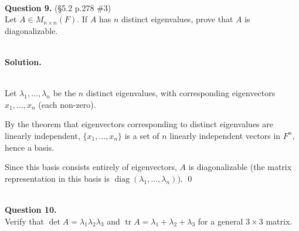 \documentclass{article}
\DeclareMathOperator{\tr}{tr}
\begin{document}
\bigskip

\hfill \break  $~\!\!$ \dotfill \medskip \\
\textbf{Question 9.} (\S5.2 p.278 \#3)\\
Let $A \in M_{n\times n}(F)$. If $A$ has $n$ distinct eigenvalues, prove that $A$ is diagonalizable.

\noindent\\
\textbf{Solution.}\\
\quad\\
\begin{mdframed}[linewidth=1pt]
Let $\lambda_1, \dots, \lambda_n$ be the $n$ distinct eigenvalues, with corresponding eigenvectors $x_1, \dots, x_n$ (each non-zero).

By the theorem that eigenvectors corresponding to distinct eigenvalues are linearly independent, $\{x_1, \dots, x_n\}$ is a set of $n$ linearly independent vectors in $F^n$, hence a basis.

Since this basis consists entirely of eigenvectors, $A$ is diagonalizable (the matrix representation in this basis is $\operatorname{diag}(\lambda_1, \dots, \lambda_n)$). \qed
\end{mdframed}

\bigskip


\hfill \break  $~\!\!$ \dotfill \medskip \\
\textbf{Question 10.}\\
Verify that $\det A = \lambda_1 \lambda_2 \lambda_3$ and $\tr A = \lambda_1 + \lambda_2 + \lambda_3$ for a general $3 \times 3$ matrix.
\end{document}
